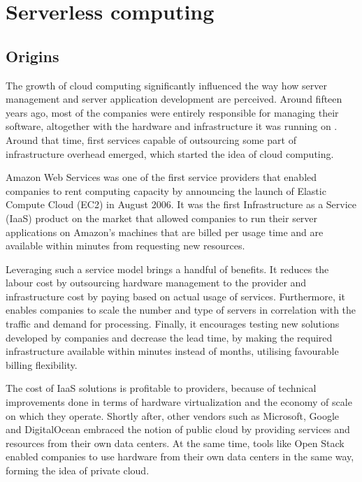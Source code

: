 \chapter{Serverless computing} \label{chapter:serverless-computing}

\section{Origins} \label{section:serverless-origins}

The growth of cloud computing significantly influenced the way how server management and server application development are perceived. Around fifteen years ago, most of the companies were entirely responsible for managing their software, altogether with the hardware and infrastructure it was running on \cite{RobertsChapin2017}. Around that time, first services capable of outsourcing some part of infrastructure overhead emerged, which started the idea of cloud computing.

Amazon Web Services was one of the first service providers that enabled companies to rent computing capacity by announcing the launch of Elastic Compute Cloud (EC2) in August 2006. It was the first Infrastructure as a Service (IaaS) product on the market that allowed companies to run their server applications on Amazon's machines that are billed per usage time and are available within minutes from requesting new resources.

Leveraging such a service model brings a handful of benefits. It reduces the labour cost by outsourcing hardware management to the provider and infrastructure cost by paying based on actual usage of services. Furthermore, it enables companies to scale the number and type of servers in correlation with the traffic and demand for processing. Finally, it encourages testing new solutions developed by companies and decrease the lead time, by making the required infrastructure available within minutes instead of months, utilising favourable billing flexibility.

The cost of IaaS solutions is profitable to providers, because of technical improvements done in terms of hardware virtualization and the economy of scale on which they operate. Shortly after, other vendors such as Microsoft, Google and DigitalOcean embraced the notion of public cloud by providing services and resources from their own data centers. At the same time, tools like Open Stack enabled companies to use hardware from their own data centers in the same way, forming the idea of private cloud.

